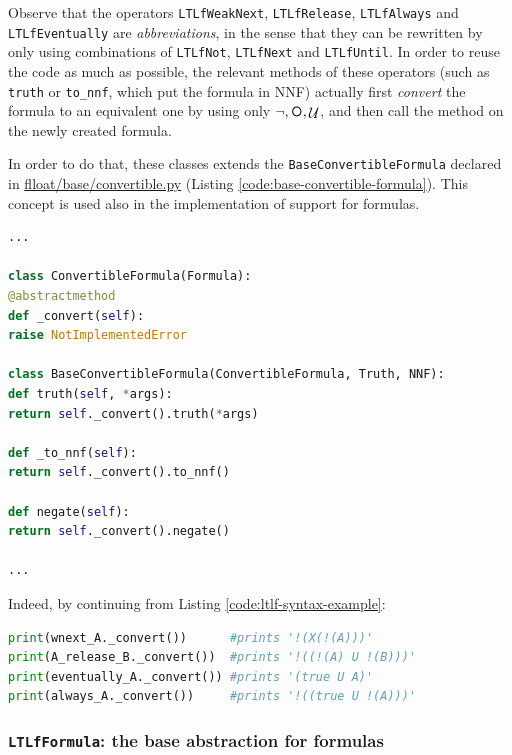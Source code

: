 Observe that the operators \texttt{LTLfWeakNext}, \texttt{LTLfRelease}, \texttt{LTLfAlways} and \texttt{LTLfEventually} are \emph{abbreviations}, in the sense that they can be rewritten by only using combinations of \texttt{LTLfNot}, \texttt{LTLfNext} and \texttt{LTLfUntil}. In order to reuse the code as much as possible, the relevant methods of these operators (such as \texttt{truth} or \texttt{to\_nnf}, which put the formula in NNF) actually first \emph{convert} the formula to an equivalent one by using only $\lnot, \Next, \lUntil$, and then call the method on the newly created formula.

In order to do that, these classes extends the \texttt{BaseConvertibleFormula} declared in \href{https://github.com/MarcoFavorito/flloat/blob/0.1.4/flloat/base/convertible.py}{flloat/base/convertible.py} (Listing \ref{code:base-convertible-formula}). This concept is used also in the implementation of support for \LDLf formulas.

\begin{lstlisting}[language=Python, style=Python, escapechar = £, label={code:base-convertible-formula}, caption={The \texttt{BaseConvertibleFormula} abstraction, in \href{https://github.com/MarcoFavorito/flloat/blob/0.1.4/flloat/base/convertible.py}{flloat/base/convertible.py}.}]
...

class ConvertibleFormula(Formula):
@abstractmethod
def _convert(self):
raise NotImplementedError

class BaseConvertibleFormula(ConvertibleFormula, Truth, NNF):
def truth(self, *args):
return self._convert().truth(*args)

def _to_nnf(self):
return self._convert().to_nnf()

def negate(self):
return self._convert().negate()

...
\end{lstlisting}

Indeed, by continuing from  Listing \ref{code:ltlf-syntax-example}:
\begin{lstlisting}[language=Python, style=Python]
print(wnext_A._convert())      #prints '!(X(!(A)))'
print(A_release_B._convert())  #prints '!((!(A) U !(B)))'
print(eventually_A._convert()) #prints '(true U A)'
print(always_A._convert())     #prints '!((true U !(A)))'
\end{lstlisting}

\subsubsection{\texttt{LTLfFormula}: the base abstraction for \LTLf formulas}

